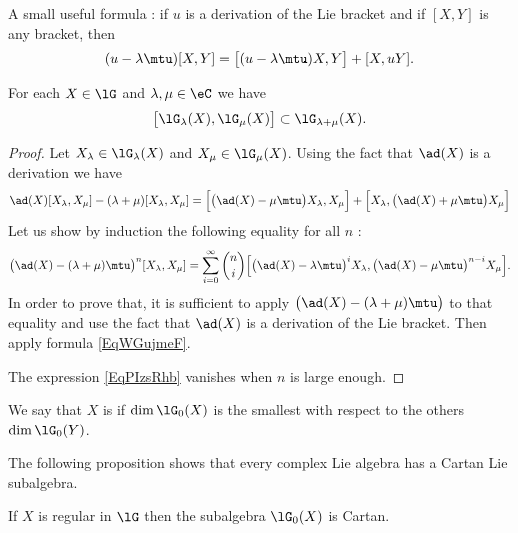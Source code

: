 A small useful formula : if \( u\) is a derivation of the Lie bracket and if \( [X,Y]\) is any bracket, then
\begin{equation}\label{EqWGujmeF}
    (u-\lambda\mtu)[X,Y]=\big[ (u-\lambda\mtu)X,Y \big]+[X,uY].
\end{equation}

\begin{lemma}   \label{LemVZzSnUW}
    For each \( X\in\lG\) and \( \lambda,\mu\in\eC\) we have
    \begin{equation}
        \big[ \lG_{\lambda}(X),\lG_{\mu}(X) \big]\subset\lG_{\lambda+\mu}(X).
    \end{equation}
\end{lemma}

\begin{proof}
    Let \( X_{\lambda}\in\lG_{\lambda}(X)\) and \( X_{\mu}\in\lG_{\mu}(X)\). Using the fact that \( \ad(X)\) is a derivation we have
    \begin{equation}
        \ad(X)[X_{\lambda},X_{\mu}]-(\lambda+\mu)[X_{\lambda},X_{\mu}]=\Big[ \big( \ad(X)-\mu\mtu \big)X_{\lambda},X_{\mu} \Big]+\Big[ X_{\lambda},\big( \ad(X)+\mu\mtu \big)X_{\mu} \Big]
    \end{equation}
    Let us show by induction the following equality for all \( n\) :
    \begin{equation}    \label{EqPIzsRhb}
        \big( \ad(X)-(\lambda+\mu)\mtu \big)^n[X_{\lambda},X_{\mu}]=\sum_{i=0}^{\infty}\binom{ n }{ i }\Big[ \big( \ad(X)-\lambda\mtu \big)^iX_{\lambda},\big( \ad(X)-\mu\mtu \big)^{n-i}X_{\mu} \Big].
    \end{equation}
    In order to prove that, it is sufficient to apply \( \big( \ad(X)-(\lambda+\mu)\mtu \big)\) to that equality and use the fact that \( \ad(X)\) is a derivation of the Lie bracket. Then apply formula \eqref{EqWGujmeF}.
    
The expression \eqref{EqPIzsRhb} vanishes when \( n\) is large enough.
\end{proof}

We say that \( X\) is  if \( \dim\lG_0(X)\) is the smallest with respect to the others \( \dim\lG_0(Y)\).

The following proposition shows that every complex Lie algebra has a Cartan Lie subalgebra.
\begin{proposition}
    If $X$ is regular in \( \lG\) then the subalgebra \( \lG_0(X)\) is Cartan.
\end{proposition}

